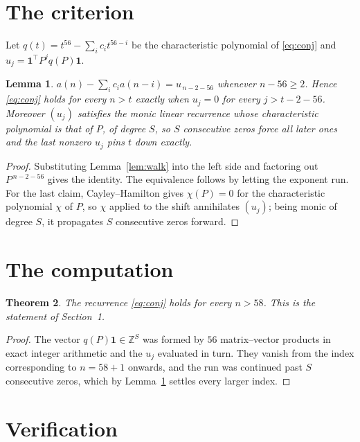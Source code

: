 \documentclass[11pt,a4paper]{article}
\theoremstyle{plain}
\newtheorem{theorem}{Theorem}
\newtheorem{lemma}[theorem]{Lemma}
\theoremstyle{definition}
\begin{document}
\section{The criterion}

Let $q(t)=t^{56}-\sum_i c_i t^{56-i}$ be the characteristic polynomial of
\eqref{eq:conj} and $u_j=\mathbf{1}^{\!\top}P^{j}q(P)\mathbf{1}$.

\begin{lemma}\label{lem:crit}
$a(n)-\sum_i c_i a(n-i)=u_{\,n-2-56}$ whenever $n-56\ge2$. Hence
\eqref{eq:conj} holds for every $n>t$ exactly when $u_j=0$ for every
$j>t-2-56$. Moreover $(u_j)$ satisfies the monic linear recurrence whose
characteristic polynomial is that of $P$, of degree $S$, so $S$ consecutive zeros force all
later ones and the last nonzero $u_j$ pins $t$ down exactly.
\end{lemma}

\begin{proof}
Substituting Lemma~\ref{lem:walk} into the left side and factoring out
$P^{\,n-2-56}$ gives the identity. The equivalence follows by letting the exponent
run. For the last claim, Cayley--Hamilton gives $\chi(P)=0$ for the characteristic
polynomial $\chi$ of $P$, so $\chi$ applied to the shift annihilates $(u_j)$; being monic of
degree $S$, it propagates $S$ consecutive zeros forward.
\end{proof}

\section{The computation}

\begin{theorem}
The recurrence \eqref{eq:conj} holds for every $n>58$. This is the statement of
Section~1.
\end{theorem}

\begin{proof}
The vector $q(P)\mathbf{1}\in\mathbb{Z}^{S}$ was formed by $56$ matrix--vector
products in exact integer arithmetic and the $u_j$ evaluated in turn. They vanish from the
index corresponding to $n=58+1$ onwards, and the run was continued past $S$ consecutive
zeros, which by Lemma~\ref{lem:crit} settles every larger index.
\end{proof}

\section{Verification}
\end{document}
